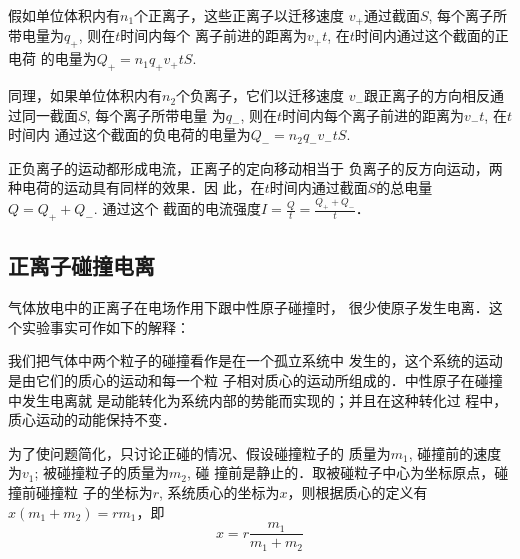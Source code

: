假如单位体积内有$n_1$个正离子，这些正离子以迁移速度
$v_+$通过截面$S$, 每个离子所带电量为$q_+$, 则在$t$时间内每个
离子前进的距离为$v_+t$, 在$t$时间内通过这个截面的正电荷
的电量为$Q_+=n_1q_+v_+tS$.

同理，如果单位体积内有$n_2$个负离子，它们以迁移速度
$v_-$跟正离子的方向相反通过同一截面$S$, 每个离子所带电量
为$q_-$, 则在$t$时间内每个离子前进的距离为$v_-t$, 在$t$时间内
通过这个截面的负电荷的电量为$Q_-=n_2q_-v_-tS$. 

正负离子的运动都形成电流，正离子的定向移动相当于
负离子的反方向运动，两种电荷的运动具有同样的效果．因
此，在$t$时间内通过截面$S$的总电量$Q=Q_+ +Q_-$. 通过这个
截面的电流强度$I=\frac{Q}{t}=\frac{Q_+ +Q_-}{t}$．

\subsection{正离子碰撞电离}
气体放电中的正离子在电场作用下跟中性原子碰撞时，
很少使原子发生电离．这个实验事实可作如下的解释：

我们把气体中两个粒子的碰撞看作是在一个孤立系统中
发生的，这个系统的运动是由它们的质心的运动和每一个粒
子相对质心的运动所组成的．中性原子在碰撞中发生电离就
是动能转化为系统内部的势能而实现的；并且在这种转化过
程中，质心运动的动能保持不变．

为了使问题简化，只讨论正碰的情况、假设碰撞粒子的
质量为$m_1$, 碰撞前的速度为$v_1$; 被碰撞粒子的质量为$m_2$, 碰
撞前是静止的．取被碰粒子中心为坐标原点，碰撞前碰撞粒
子的坐标为$r$, 系统质心的坐标为$x$，则根据质心的定义有
$x(m_1+m_2)=rm_1$，即
\[x=r\frac{m_1}{m_1+m_2}\]
